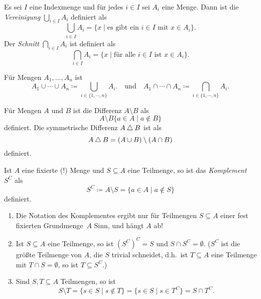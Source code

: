 \begin{defi}
 Es sei $I$ eine Indexmenge und für jedes $i \in I$ sei $A_i$ eine Menge. Dann ist die \emph{Vereinigung} $\bigcup_{i \in I} A_i$ definiert als
 \[
  \bigcup_{i \in I} A_i
  = \{x \mid \text{es gibt ein $i \in I$ mit $x \in A_i$}\}.
 \]
 Der \emph{Schnitt} $\bigcap_{i \in I} A_i$ ist definiert als
 \[
  \bigcap_{i \in I} A_i
  = \{x \mid \text{für alle $i \in I$ ist $x \in A_i$}\}.
 \]
 
 Für Mengen $A_1, \dotsc, A_n$ ist
 \[
  A_1 \cup \dotsb \cup A_n \coloneqq \bigcup_{i \in \{1, \dotsb, n\}} A_i.
  \quad\text{und}\quad
  A_1 \cap \dotsb \cap A_n \coloneqq \bigcap_{i \in \{1, \dotsb, n\}} A_i.
 \]
\end{defi}


\begin{defi}
 Für Mengen $A$ und $B$ ist die Differenz $A \setminus B$ als
 \[
  A \setminus B \{a \in A \mid a \notin B\}
 \]
 definiert. Die symmetrische Differenz $A \bigtriangleup B$ ist als
 \[
  A \bigtriangleup B = (A \cup B) \setminus (A \cap B)
 \]
 definiert.
\end{defi}


\begin{defi}
 Ist $A$ eine fixierte (!) Menge und $S \subseteq A$ eine Teilmenge, so ist das \emph{Komplement} $S^C$ als
 \[
  S^C
  \coloneqq A \setminus S
  = \{a \in A \mid a \notin S\}
 \]
 definiert.
\end{defi}


\begin{bem}
 \begin{enumerate}[leftmargin=*]
  \item
   Die Notation des Komplementes ergibt nur für Teilmengen $S \subseteq A$ einer fest fixierten Grundmenge  $A$ Sinn, und hängt $A$ ab!
  \item
   Ist $S \subseteq A$ eine Teilmenge, so ist $(S^C)^C = S$ und $S \cap S^C = \emptyset$. ($S^C$ ist die größte Teilmenge von $A$, die $S$ trivial schneidet, d.h.\ ist $T \subseteq A$ eine Teilmenge mit $T \cap S = \emptyset$, so ist $T \subseteq S^C$.)
  \item
   Sind $S, T \subseteq A$ Teilmengen, so ist
   \[
    S \setminus T
    = \{s \in S \mid s \notin T\}
    = \{s \in S \mid s \in T^C\}
    = S \cap T^C.
   \]
 \end{enumerate}
\end{bem}


